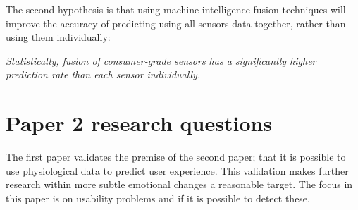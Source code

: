 The second hypothesis is that using machine intelligence fusion techniques will improve the accuracy of predicting using all sensors data together, rather than using them individually:

\textit{Statistically, fusion of consumer-grade sensors has a significantly higher prediction rate than each sensor individually.}

\section{Paper 2 research questions}
The first paper validates the premise of the second paper; that it is possible to use physiological data to predict user experience.
This validation makes further research within more subtle emotional changes a reasonable target. 
The focus in this paper is on usability problems and if it is possible to detect these.
